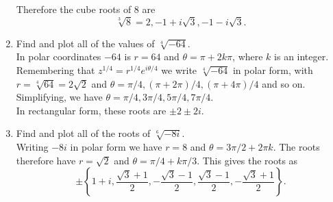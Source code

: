 \documentclass{article}
\begin{document}
\begin{enumerate}
{		Therefore the cube roots of 8 are
		\begin{equation*}
			\sqrt[3]{8} = 2, -1+i\sqrt{3}, -1-i\sqrt{3} .
		\end{equation*}			
	}
	\item{Find and plot all of the values of $\sqrt[4]{-64}$. \\
		In polar coordinates $-64$ is $r = 64$ and $\theta = \pi + 2k\pi$, where $k$ is an integer.  
		Remembering that $z^{1/4} = r^{1/4} e^{i\theta/4}$ we write $\sqrt[4]{-64}$ in polar form, with $r = \sqrt[4]{64} = 2\sqrt{2}$ and $\theta = \pi/4, (\pi + 2\pi)/4, (\pi + 4\pi)/4$ and so on.  
		Simplifying, we have $\theta = \pi/4, 3\pi/4, 5\pi/4, 7\pi/4$. \\
		In rectangular form, these roots are $\pm 2 \pm 2i$.
	}	
	\item{Find and plot all of the roots of $\sqrt[6]{-8i}$. \\
		Writing $-8i$ in polar form we have $r = 8$ and $\theta = 3\pi/2 + 2\pi k$.
		The roots therefore have $r = \sqrt{2}$ and $\theta = \pi/4 + k \pi/3$.
		This gives the roots as 
		\begin{equation*}
			\pm \left\{ 1+i, \frac{\sqrt{3} + 1}{2}, - \frac{\sqrt{3} - 1}{2}, \frac{\sqrt{3} - 1}{2}, - \frac{\sqrt{3} + 1}{2} \right\} .
		\end{equation*}
	}
\end{enumerate}
\end{document}
